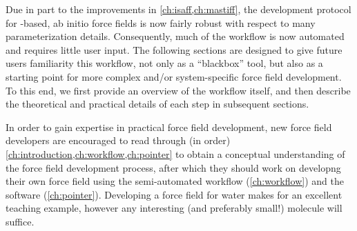 Due in part to the improvements in \cref{ch:isaff,ch:mastiff}, the development
protocol for \sapt-based, ab initio force fields is now fairly robust with
respect to many parameterization details. Consequently, much of the workflow
is now automated and requires little user input. The following sections are
designed to give future users familiarity this workflow, not only as a
``blackbox'' tool, but also as a starting point for more complex and/or
system-specific force field development. To this end, we first provide an
overview of the workflow itself, and then describe the theoretical and
practical details of each step in subsequent sections.

In order to gain expertise in practical force field development, new force field developers are encouraged to read through (in order)
\cref{ch:introduction,ch:workflow,ch:pointer} to obtain a conceptual
understanding of the force field development process, after which they should
work on
developng their own force field using
the semi-automated workflow (\cref{ch:workflow}) and the \pointer software
(\cref{ch:pointer}). Developing a force field for water
makes for an excellent teaching example, however any interesting (and preferably
small!) molecule will suffice.

